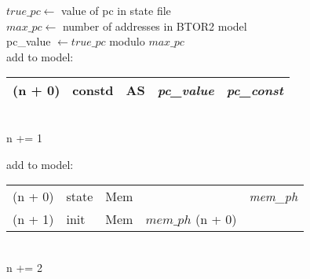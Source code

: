 \begin{algorithm}
    $true\_pc \leftarrow$ value of pc in state file\\
    $max\_pc \leftarrow$ number of addresses in BTOR2 model\\
    \textcolor{UniBlue}{pc\_value} $\leftarrow true\_pc$ modulo $max\_pc$\\
    add to model:\\
    \begin{tabular}[h]{>{\color{UniRed}}r l >{\color{UniGrey}}l l >{\itshape} l}
        \hline
        \hline
        \ttfamily
        (n + 0) & constd & AS & \textcolor{UniBlue}{\rmfamily\textit{pc\_value}} & pc\_const \\
        \hline
        \hline
    \end{tabular}\\
    \textcolor{UniRed}{n} += 1
    \BlankLine

    \BlankLine
    add to model:\\

    \begin{tabular}[h]{>{\ttfamily\color{UniRed}}r >{\ttfamily}l >{\ttfamily\color{UniGrey}}l >{\ttfamily}l >{\itshape} l}
        \hline
        \hline
        (n + 0) & state & Mem &                                       & mem\_ph \\
        (n + 1) & init  & Mem & \textcolor{UniRed}{$mem\_ph$ (n + 0)} &         \\
        \hline
        \hline
    \end{tabular}\\
    \textcolor{UniRed}{n} += 2\\


\end{algorithm}
